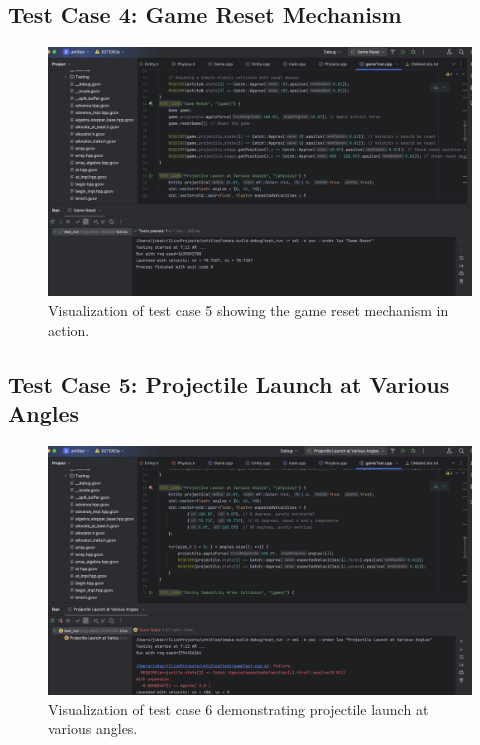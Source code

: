 \documentclass[12pt]{article}
\begin{document}
\subsection{Test Case 4: Game Reset Mechanism}

\begin{figure}[h!]
    \centering
    \includegraphics[width=\linewidth]{t5.png} 
    \caption{Visualization of test case 5 showing the game reset mechanism in action.}
    \label{fig:test_case_5}
\end{figure}
\FloatBarrier
\subsection{Test Case 5: Projectile Launch at Various Angles}

\begin{figure}[h!]
    \centering
    \includegraphics[width=\linewidth]{t6.png} 
    \caption{Visualization of test case 6 demonstrating projectile launch at various angles.}
    \label{fig:test_case_6}
\end{figure}
\FloatBarrier
\end{document}
